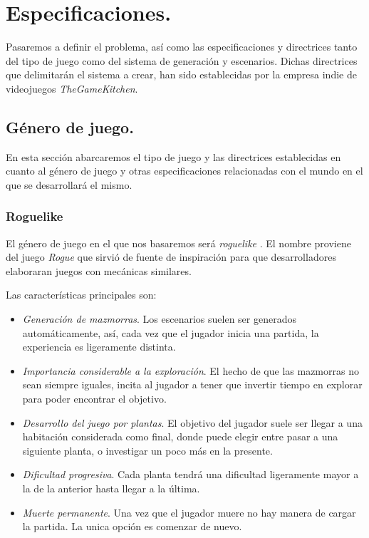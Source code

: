 \chapter{Especificaciones.}\label{cap:capitulo2}

Pasaremos a definir el problema, así como las especificaciones y directrices tanto del tipo de juego como del sistema de generación y escenarios. Dichas directrices que delimitarán el sistema a crear, han sido establecidas por la empresa indie de videojuegos \emph{TheGameKitchen}\cite{tgc}.

\section{Género de juego.}

En esta sección abarcaremos el tipo de juego y las directrices establecidas en cuanto al género de juego y otras especificaciones relacionadas con el mundo en el que se desarrollará el mismo.

\subsection{Roguelike}

El género de juego en el que nos basaremos será \emph{roguelike} \cite{rlike}. El nombre proviene del juego \emph{Rogue} que sirvió de fuente de inspiración para que desarrolladores elaboraran juegos con mecánicas similares.

Las características principales son:

\begin{itemize}
	\item \emph{Generación de mazmorras}. Los escenarios suelen ser generados automáticamente, así, cada vez que el jugador inicia una partida, la experiencia es ligeramente distinta.
	\item \emph{Importancia considerable a la exploración}. El hecho de que las mazmorras no sean siempre iguales, incita al jugador a tener que invertir tiempo en explorar para poder encontrar el objetivo.
	\item \emph{Desarrollo del juego por plantas}. El objetivo del jugador suele ser llegar a una habitación considerada como final, donde puede elegir entre pasar a una siguiente planta, o investigar un poco más en la presente.
	\item \emph{Dificultad progresiva}. Cada planta tendrá una dificultad ligeramente mayor a la de la anterior hasta llegar a la última.
	\item \emph{Muerte permanente}. Una vez que el jugador muere no hay manera de cargar la partida. La unica opción es comenzar de nuevo.
\end{itemize}

